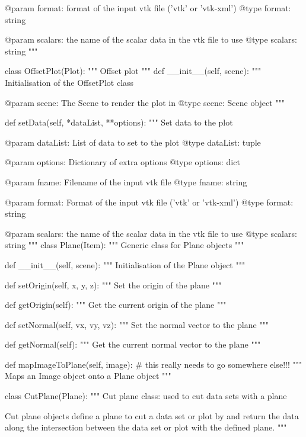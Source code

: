 \begin{python}
\begin{python}
\begin{verbose}
	@param format: format of the input vtk file ('vtk' or 'vtk-xml')
	@type format: string

	@param scalars: the name of the scalar data in the vtk file to use
	@type scalars: string
        """

class OffsetPlot(Plot):
    """
    Offset plot
    """
    def __init__(self, scene):
        """
        Initialisation of the OffsetPlot class
        
        @param scene: The Scene to render the plot in
        @type scene: Scene object
        """

    def setData(self, *dataList, **options):
        """
        Set data to the plot

        @param dataList: List of data to set to the plot
        @type dataList: tuple

        @param options: Dictionary of extra options
        @type options: dict

	@param fname: Filename of the input vtk file
	@type fname: string

	@param format: Format of the input vtk file ('vtk' or 'vtk-xml')
	@type format: string

	@param scalars: the name of the scalar data in the vtk file to use
	@type scalars: string
        """
class Plane(Item):
    """
    Generic class for Plane objects
    """

    def __init__(self, scene):
        """
        Initialisation of the Plane object
        """

    def setOrigin(self, x, y, z):
        """
        Set the origin of the plane
        """

    def getOrigin(self):
        """
        Get the current origin of the plane
        """

    def setNormal(self, vx, vy, vz):
        """
        Set the normal vector to the plane
        """

    def getNormal(self):
        """
        Get the current normal vector to the plane
        """

    def mapImageToPlane(self, image):
        # this really needs to go somewhere else!!!
        """
        Maps an Image object onto a Plane object
        """

class CutPlane(Plane):
    """
    Cut plane class: used to cut data sets with a plane

    Cut plane objects define a plane to cut a data set or plot by and return
    the data along the intersection between the data set or plot with the
    defined plane.
    """


\end{verbose}
\end{python}
\end{python}
